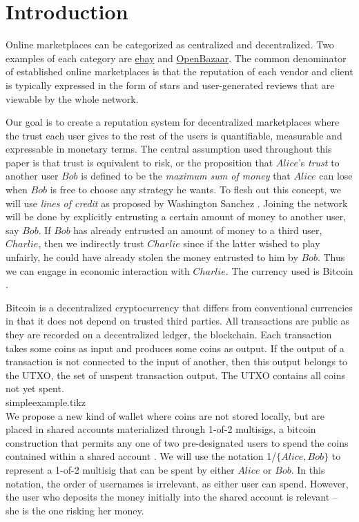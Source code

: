 \section{Introduction}
  Online marketplaces can be categorized as centralized and decentralized.
  Two examples of each category are \href{http://www.ebay.com}{ebay} and \href{https://openbazaar.org/}{OpenBazaar}.
  The common denominator of established online marketplaces is that the reputation of each vendor and client is typically
  expressed in the form of stars and user-generated reviews that are viewable by the whole network.

  Our goal is to create a reputation system for decentralized marketplaces where the trust each user gives to the rest of
  the users is quantifiable, measurable and expressable in monetary terms. The central assumption used throughout this paper
  is that trust is equivalent to risk, or the proposition that $Alice$'s \textit{trust} to another user $Bob$ is defined to
  be the \textit{maximum sum of money} that $Alice$ can lose when $Bob$ is free to choose any strategy he wants. To flesh
  out this concept, we will use \textit{lines of credit} as proposed by Washington Sanchez \cite{loc}. Joining the network
  will be done by explicitly entrusting a certain amount of money to another user, say $Bob$. If $Bob$ has already entrusted
  an amount of money to a third user, $Charlie$, then we indirectly trust $Charlie$ since if the latter wished to play
  unfairly, he could have already stolen the money entrusted to him by $Bob$. Thus we can engage in economic interaction
  with $Charlie$. The currency used is Bitcoin \cite{bitcoin}.

  Bitcoin is a decentralized cryptocurrency that differs from conventional currencies in that it does not depend on trusted
  third parties. All transactions are public as they are recorded on a decentralized ledger, the blockchain. Each transaction
  takes some coins as input and produces some coins as output. If the output of a transaction is not connected to the input
  of another, then this output belongs to the UTXO, the set of unspent transaction output. The UTXO contains all coins not
  yet spent.
  \medskip \ \\
  {simpleexample.tikz} \smallskip \ \\
  We propose a new kind of wallet where coins are not stored locally, but are placed in shared accounts materialized through
  1-of-2 multisigs, a bitcoin construction that permits any one of two pre-designated users to spend the coins contained
  within a shared account \cite{masteringbitcoin}. We will use the notation 1/$\{Alice, Bob\}$ to represent a 1-of-2
  multisig that can be spent by either $Alice$ or $Bob$. In this notation, the order of usernames is irrelevant, as either
  user can spend. However, the user who deposits the money initially into the shared account is relevant -- she is the one
  risking her money.

